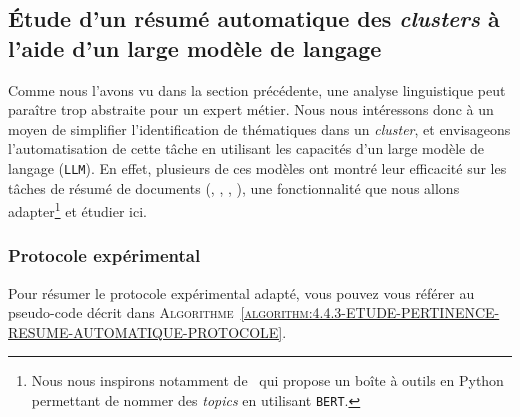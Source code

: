 	
	\subsection{Étude d'un résumé automatique des \textit{clusters} à l'aide d'un large modèle de langage}
	\label{section:4.4.3-ETUDE-PERTINENCE-RESUME-AUTOMATIQUE}
		
		Comme nous l'avons vu dans la section précédente, une analyse linguistique peut paraître trop abstraite pour un expert métier.
		Nous nous intéressons donc à un moyen de simplifier l'identification de thématiques dans un \textit{cluster}, et envisageons l'automatisation de cette tâche en utilisant les capacités d'un large modèle de langage (\texttt{LLM}).
		En effet, plusieurs de ces modèles ont montré leur efficacité sur les tâches de résumé de documents (\cite{zhang-etal:2019:pegasus-pretraining-extracted}, \cite{lewis-etal:2019:bart-denoising-sequencetosequence}, \cite{radford-etal:2019:language-models-are}, \cite{brown-etal:2020:language-models-are}), une fonctionnalité que nous allons adapter\footnote{
			Nous nous inspirons notamment de~\cite{alammar-grefenstette:2022:cohere-sandbox} qui propose un boîte à outils en Python permettant de nommer des \textit{topics} en utilisant \texttt{BERT}.
		}
		et étudier ici.
	
		\subsubsection{Protocole expérimental}
			
			Pour résumer le protocole expérimental adapté, vous pouvez vous référer au pseudo-code décrit dans \textsc{Algorithme~\ref{algorithm:4.4.3-ETUDE-PERTINENCE-RESUME-AUTOMATIQUE-PROTOCOLE}}.
			
